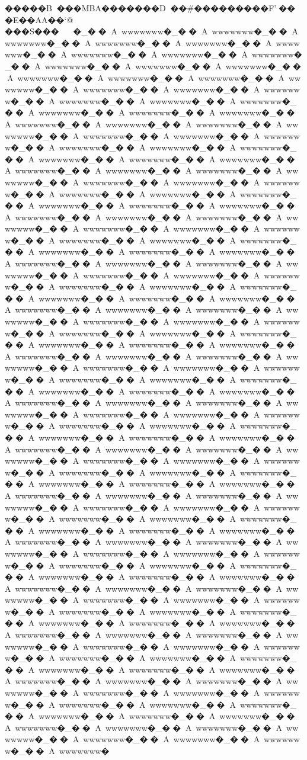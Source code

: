 {{{{{{{{{{{{{{{{{{{{{{{{{{{{{{{{{{{{�����B���MBA�������D��#���������F'���E��AA��  `@ ���S����_��A~wwwwwww�_��A~wwwwwww�_��A~wwwwwww�_��A~wwwwwww�_��A~wwwwwww�_��A~wwwwwww�_��A~wwwwwww�_��A~wwwwwww�_��A~wwwwwww�_��A~wwwwwww�_��A~wwwwwww�_��A~wwwwwww�_��A~wwwwwww�_��A~wwwwwww�_��A~wwwwwww�_��A~wwwwwww�_��A~wwwwwww�_��A~wwwwwww�_��A~wwwwwww�_��A~wwwwwww�_��A~wwwwwww�_��A~wwwwwww�_��A~wwwwwww�_��A~wwwwwww�_��A~wwwwwww�_��A~wwwwwww�_��A~wwwwwww�_��A~wwwwwww�_��A~wwwwwww�_��A~wwwwwww�_��A~wwwwwww�_��A~wwwwwww�_��A~wwwwwww�_��A~wwwwwww�_��A~wwwwwww�_��A~wwwwwww�_��A~wwwwwww�_��A~wwwwwww�_��A~wwwwwww�_��A~wwwwwww�_��A~wwwwwww�_��A~wwwwwww�_��A~wwwwwww�_��A~wwwwwww�_��A~wwwwwww�_��A~wwwwwww�_��A~wwwwwww�_��A~wwwwwww�_��A~wwwwwww�_��A~wwwwwww�_��A~wwwwwww�_��A~wwwwwww�_��A~wwwwwww�_��A~wwwwwww�_��A~wwwwwww�_��A~wwwwwww�_��A~wwwwwww�_��A~wwwwwww�_��A~wwwwwww�_��A~wwwwwww�_��A~wwwwwww�_��A~wwwwwww�_��A~wwwwwww�_��A~wwwwwww�_��A~wwwwwww�_��A~wwwwwww�_��A~wwwwwww�_��A~wwwwwww�_��A~wwwwwww�_��A~wwwwwww�_��A~wwwwwww�_��A~wwwwwww�_��A~wwwwwww�_��A~wwwwwww�_��A~wwwwwww�_��A~wwwwwww�_��A~wwwwwww�_��A~wwwwwww�_��A~wwwwwww�_��A~wwwwwww�_��A~wwwwwww�_��A~wwwwwww�_��A~wwwwwww�_��A~wwwwwww�_��A~wwwwwww�_��A~wwwwwww�_��A~wwwwwww�_��A~wwwwwww�_��A~wwwwwww�_��A~wwwwwww�_��A~wwwwwww�_��A~wwwwwww�_��A~wwwwwww�_��A~wwwwwww�_��A~wwwwwww�_��A~wwwwwww�_��A~wwwwwww�_��A~wwwwwww�_��A~wwwwwww�_��A~wwwwwww�_��A~wwwwwww�_��A~wwwwwww�_��A~wwwwwww�_��A~wwwwwww�_��A~wwwwwww�_��A~wwwwwww�_��A~wwwwwww�_��A~wwwwwww�_��A~wwwwwww�_��A~wwwwwww�_��A~wwwwwww�_��A~wwwwwww�_��A~wwwwwww�_��A~wwwwwww�_��A~wwwwwww�_��A~wwwwwww�_��A~wwwwwww�_��A~wwwwwww�_��A~wwwwwww�_��A~wwwwwww�_��A~wwwwwww�_��A~wwwwwww�_��A~wwwwwww�_��A~wwwwwww�_��A~wwwwwww�_��A~wwwwwww�_��A~wwwwwww�_��A~wwwwwww�_��A~wwwwwww�_��A~wwwwwww�_��A~wwwwwww�_��A~wwwwwww�_��A~wwwwwww�_��A~wwwwwww�_��A~wwwwwww�_��A~wwwwwww�_��A~wwwwwww�_��A~wwwwwww�_��A~wwwwwww�_��A~wwwwwww�_��A~wwwwwww�_��A~wwwwwww�_��A~wwwwwww�_��A~wwwwwww�_��A~wwwwwww�_��A~wwwwwww�_��A~wwwwwww�_��A~wwwwwww�_��A~wwwwwww�_��A~wwwwwww�_��A~wwwwwww�_��A~wwwwwww�_��A~wwwwwww�_��A~wwwwwww�_��A~wwwwwww�_��A~wwwwwww�_��A~wwwwwww�_��A~wwwwwww�_��A~wwwwwww�_��A~wwwwwww�_��A~wwwwwww�_��A~wwwwwww�_��A~wwwwwww�_��A~wwwwwww�_��A~wwwwwww�_��A~wwwwwww�_��A~wwwwwww�_��A~wwwwwww�_��A~wwwwwww�_��A~wwwwwww�_��A~wwwwwww�_��A~wwwwwww�_��A~wwwwwww�_��A~wwwwwww�_��A~wwwwwww�_��A~wwwwwww�_��A~wwwwwww�_��A~wwwwwww�_��A~wwwwwww�_��A~wwwwwww�_��A~wwwwwww�_��A~wwwwwww�_��A~wwwwwww�_��A~wwwwwww�_��A~wwwwwww�_��A~wwwwwww�_��A~wwwwwww�_��A~wwwwwww�_��A~wwwwwww�_��A~wwwwwww�_��A~wwwwwww�_��A~wwwwwww�_��A~wwwwwww�_��A~wwwwwww�_��A~wwwwwww�_��A~wwwwwww�_��A~wwwwwww�_��A~wwwwwww�_��A~wwwwwww�_��A~wwwwwww�_��A~wwwwwww�_��A~wwwwwww�}}}}}}}}}}}}}}}}}}}}}}}}}}}}}}}}}}}}
